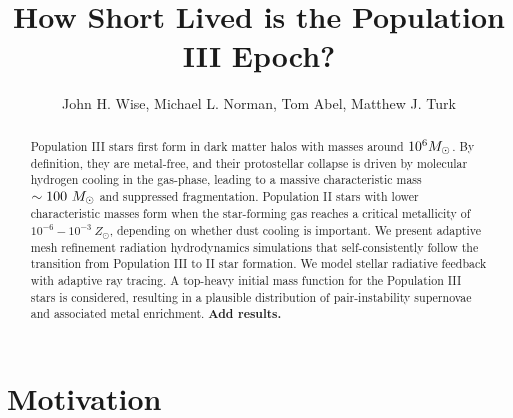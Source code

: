 \documentclass[apjl]{emulateapj}
\begin{document}

\title{How Short Lived is the Population III Epoch?}

\author{John H. Wise, 
  Michael L. Norman,
  Tom Abel,
  Matthew J. Turk}


\begin{abstract}

  Population III stars first form in dark matter halos with masses
  around $10^6 \Ms$.  By definition, they are metal-free, and their
  protostellar collapse is driven by molecular hydrogen cooling in the
  gas-phase, leading to a massive characteristic mass $\sim 100~\Ms$
  and suppressed fragmentation.  Population II stars with lower
  characteristic masses form when the star-forming gas reaches a
  critical metallicity of $10^{-6} - 10^{-3}~Z_\odot$, depending on
  whether dust cooling is important.  We present adaptive mesh
  refinement radiation hydrodynamics simulations that
  self-consistently follow the transition from Population III to II
  star formation.  We model stellar radiative feedback with adaptive
  ray tracing.  A top-heavy initial mass function for the Population
  III stars is considered, resulting in a plausible distribution of
  pair-instability supernovae and associated metal enrichment.
  \textbf{Add results.}

\end{abstract}


\section{Motivation}
\end{document}
